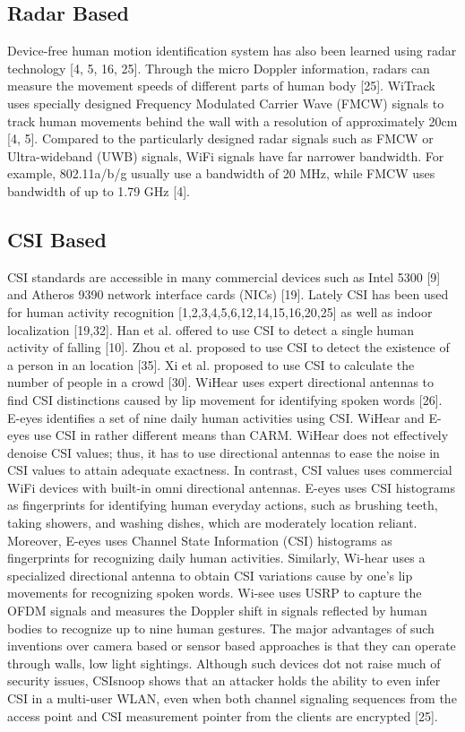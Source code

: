 \documentclass[conference]{IEEEtran}
\begin{document}
 \subsection{ Radar Based }
 Device-free human motion identification system has also been learned using radar technology [4, 5, 16, 25]. Through the micro Doppler information, radars can measure the movement speeds of different parts of human body [25]. WiTrack uses specially designed Frequency Modulated Carrier Wave (FMCW) signals to track human movements behind the wall with a resolution of approximately 20cm [4, 5]. Compared to the particularly designed radar signals such as FMCW or Ultra-wideband (UWB) signals, WiFi signals have far narrower bandwidth. For example, 802.11a/b/g usually use a bandwidth of 20 MHz, while FMCW uses bandwidth of up to 1.79 GHz [4]. 
 \subsection{CSI Based}
CSI standards are accessible in many commercial devices such as Intel 5300 [9] and Atheros 9390 network interface cards (NICs) [19]. Lately CSI has been used for human activity recognition [1,2,3,4,5,6,12,14,15,16,20,25] as well as indoor localization [19,32]. Han et al. offered to use CSI to detect a single human activity of falling [10]. Zhou et al. proposed to use CSI to detect the existence of a person in an location [35]. Xi et al. proposed to use CSI to calculate the number of people in a crowd [30]. WiHear uses expert directional antennas to find CSI distinctions caused by lip movement for identifying spoken words [26]. E-eyes identifies a set of nine daily human activities using CSI. WiHear and E-eyes use CSI in rather different means than CARM. WiHear does not effectively denoise CSI values; thus, it has to use directional antennas to ease the noise in CSI values to attain adequate exactness. In contrast, CSI values uses commercial WiFi devices with built-in omni directional antennas. E-eyes uses CSI histograms as fingerprints for identifying human everyday actions, such as brushing teeth, taking showers, and washing dishes, which are moderately location reliant.
\newline
Moreover, E-eyes uses Channel State Information (CSI) histograms as fingerprints for recognizing daily human activities. Similarly, Wi-hear uses a specialized directional antenna to obtain CSI variations cause by one’s lip movements for recognizing spoken words. Wi-see uses USRP to capture the OFDM signals and measures the Doppler shift in signals reflected by human bodies to recognize up to nine human gestures. The major advantages of such inventions over camera based or sensor based approaches is that they can operate through walls, low light sightings. Although such devices dot not raise much of security issues, CSIsnoop shows that an attacker holds the ability to even infer CSI in a multi-user WLAN, even when both channel signaling sequences from the access point and CSI measurement pointer from the clients are encrypted [25]. 
\end{document}
